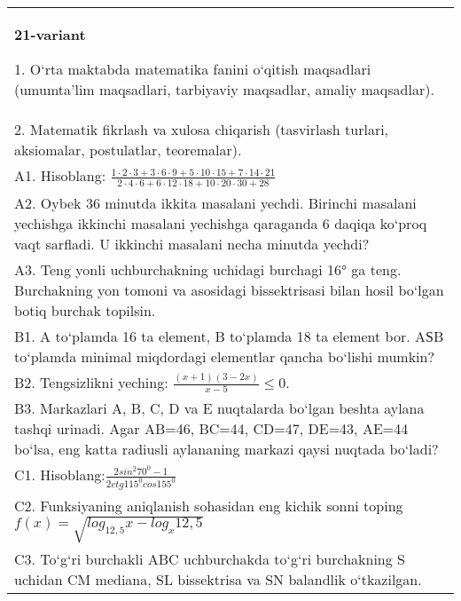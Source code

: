 \documentclass{article}
\begin{document}
\begin{tabular}{m{17cm}}
\textbf{21-variant}

1. O‘rta maktabda matematika fanini o‘qitish maqsadlari (umumta’lim maqsadlari, tarbiyaviy maqsadlar, amaliy maqsadlar). \\
2. Matematik fikrlash va xulosa chiqarish (tasvirlash turlari, aksiomalar, postulatlar, teoremalar). \\
A1. Hisoblang: \(\frac{1 \cdot 2 \cdot 3 + 3 \cdot 6 \cdot 9 + 5 \cdot 10 \cdot 15 + 7 \cdot 14 \cdot 21}{2 \cdot 4 \cdot 6 + 6 \cdot 12 \cdot 18 + 10 \cdot 20 \cdot 30 + 28}\) \\
A2. Oybek 36 minutda ikkita masalani yechdi. Birinchi masalani yechishga ikkinchi masalani yechishga qaraganda 6 daqiqa ko‘proq vaqt sarfladi. U ikkinchi masalani necha minutda yechdi? \\
A3. Teng yonli uchburchakning uchidagi burchagi 16° ga teng. Burchakning yon tomoni va asosidagi bissektrisasi bilan hosil bo‘lgan botiq burchak topilsin. \\
B1. A to‘plamda 16 ta element, B to‘plamda 18 ta element bor. AЅB to‘plamda minimal miqdordagi elementlar qancha bo‘lishi mumkin? \\
B2. Tengsizlikni yeching: \(\frac{ (x + 1) (3 - 2x) }{x - 5} \leq 0\). \\
B3. Markazlari A, B, C, D va E nuqtalarda bo‘lgan beshta aylana tashqi urinadi. Agar AB=46, BC=44, CD=47, DE=43, AE=44 bo‘lsa, eng katta radiusli aylananing markazi qaysi nuqtada bo‘ladi? \\
C1. Hisoblang:\(\frac{2sin^{2}70^{0} - 1}{2ctg115^{0}cos155^{0}}\) \\
C2. Funksiyaning aniqlanish sohasidan eng kichik sonni toping \(f (x) = \sqrt{log_{12,5}x - log_{x}12,5}\) \\
C3. To‘g‘ri burchakli ABC uchburchakda to‘g‘ri burchakning S uchidan CM mediana, SL bissektrisa va SN balandlik o‘tkazilgan. \\

\end{tabular}
\vspace{1cm}
\end{document}
